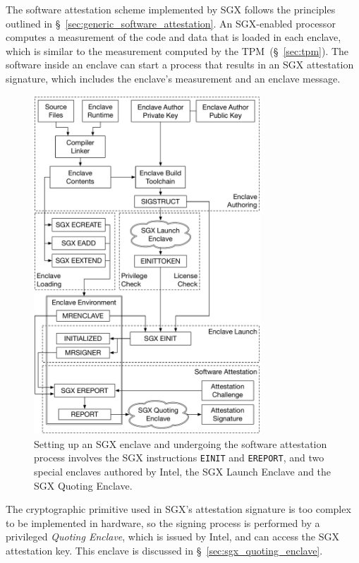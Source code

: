 \label{sec:sgx_attestation}

The software attestation scheme implemented by SGX follows the principles
outlined in \S~\ref{sec:generic_software_attestation}. An SGX-enabled processor
computes a measurement of the code and data that is loaded in each enclave,
which is similar to the measurement computed by the TPM~(\S~\ref{sec:tpm}). The
software inside an enclave can start a process that results in an SGX
attestation signature, which includes the enclave's measurement and an enclave
message.

\begin{figure}[hbt]
  \centering
  \includegraphics[width=85mm]{figures/sgx_attestation_overview.pdf}
  \caption{
    Setting up an SGX enclave and undergoing the software attestation process
    involves the SGX instructions \texttt{EINIT} and \texttt{EREPORT}, and two
    special enclaves authored by Intel, the SGX Launch Enclave and the SGX
    Quoting Enclave.
  }
  \label{fig:sgx_attestation_overview}
\end{figure}


The cryptographic primitive used in SGX's attestation signature is too complex
to be implemented in hardware, so the signing process is performed by a
privileged \textit{Quoting Enclave}, which is issued by Intel, and can access
the SGX attestation key. This enclave is discussed in
\S~\ref{sec:sgx_quoting_enclave}.

